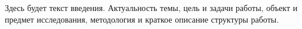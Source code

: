 
Здесь будет текст введения. Актуальность темы, цель и задачи работы,
объект и предмет исследования, методология и краткое описание структуры
работы.
